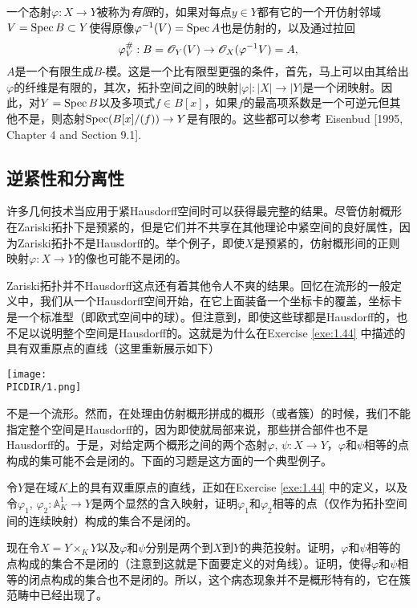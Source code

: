一个态射$\varphi:X\to Y$被称为\textit{有限}的，如果对每点$y\in Y$都有它的一个开仿射邻域$V=\operatorname{Spec} B\subset Y$使得原像$\varphi^{-1}(V)=\operatorname{Spec} A$也是仿射的，以及通过拉回
\[
	\varphi_V^\#: B =\mathscr{O}_Y(V)\to \mathscr{O}_X(\varphi^{-1}V)=A,
\]
$A$是一个有限生成$B$-模。这是一个比有限型更强的条件，首先，马上可以由其给出$\varphi$的纤维是有限的，其次，拓扑空间之间的映射$|\varphi|:|X|\to |Y|$是一个闭映射。因此，对$Y=\operatorname{Spec} B$以及多项式$f\in B[x]$，如果$f$的最高项系数是一个可逆元但其他不是，则态射$\operatorname{Spec}(B[x]/(f))\to Y$是有限的。这些都可以参考 Eisenbud [1995, Chapter 4 and Section 9.1].

\subsection{逆紧性和分离性}\label{s:3.1.2}

许多几何技术当应用于紧Hausdorff空间时可以获得最完整的结果。尽管仿射概形在Zariski拓扑下是预紧的，但是它们并不共享在其他理论中紧空间的良好属性，因为Zariski拓扑不是Hausdorff的。举个例子，即使$X$是预紧的，仿射概形间的正则映射$\varphi:X\to Y$的像也可能不是闭的。

Zariski拓扑并不Hausdorff这点还有着其他令人不爽的结果。回忆在流形的一般定义中，我们从一个Hausdorff空间开始，在它上面装备一个坐标卡的覆盖，坐标卡是一个标准型（即欧式空间中的球）。但注意到，即使这些球都是Hausdorff的，也不足以说明整个空间是Hausdorff的。这就是为什么在Exercise \ref{exe:1.44} 中描述的具有双重原点的直线（这里重新展示如下）

\begin{center}\texttt{[image: \\PICDIR/1.png]}\end{center}

\vspace{-0.4em}\noindent 不是一个流形。然而，在处理由仿射概形拼成的概形（或者簇）的时候，我们不能指定整个空间是Hausdorff的，因为即使就局部来说，那些拼合部件也不是Hausdorff的。于是，对给定两个概形之间的两个态射$\varphi$, $\psi:X\to Y$，$\varphi$和$\psi$相等的点构成的集可能不会是闭的。下面的习题是这方面的一个典型例子。

\begin{exe}
\begin{compactenum}[(a)]
\item 令$Y$是在域$K$上的具有双重原点的直线，正如在Exercise \ref{exe:1.44} 中的定义，以及令$\varphi_1$, $\varphi_2:\mathbb{A}_K^1\to Y$是两个显然的含入映射，证明$\varphi_1$和$\varphi_2$相等的点（仅作为拓扑空间间的连续映射）构成的集合不是闭的。
\item 现在令$X=Y\times_K Y$以及$\varphi$和$\psi$分别是两个到$X$到$Y$的典范投射。证明，$\varphi$和$\psi$相等的点构成的集合不是闭的（注意到这就是下面要定义的对角线）。证明，使得$\varphi$和$\psi$相等的闭点构成的集合也不是闭的。所以，这个病态现象并不是概形特有的，它在簇范畴中已经出现了。
\end{compactenum}
\end{exe}

